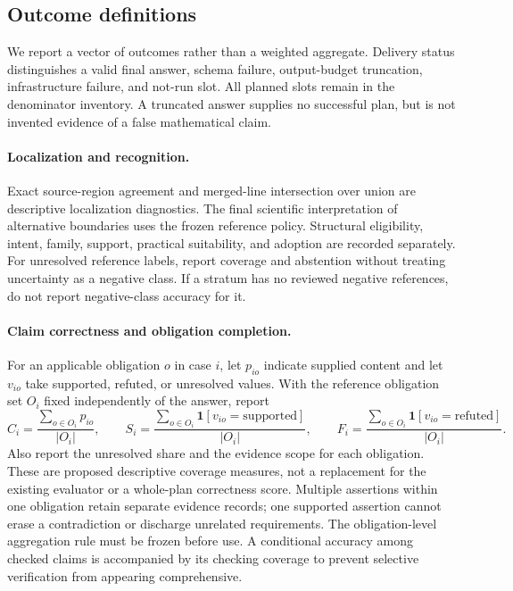 \subsection{Outcome definitions}
We report a vector of outcomes rather than a weighted aggregate. Delivery status
distinguishes a valid final answer, schema failure, output-budget truncation,
infrastructure failure, and not-run slot. All planned slots remain in the
denominator inventory. A truncated answer supplies no successful plan, but is not
invented evidence of a false mathematical claim.

\paragraph{Localization and recognition.}
Exact source-region agreement and merged-line intersection over union are
descriptive localization diagnostics. The final scientific interpretation of
alternative boundaries uses the frozen reference policy. Structural eligibility,
intent, family, support, practical suitability, and adoption are recorded
separately. For unresolved reference labels, report coverage and abstention
without treating uncertainty as a negative class. If a stratum has no reviewed
negative references, do not report negative-class accuracy for it.

\paragraph{Claim correctness and obligation completion.}
For an applicable obligation $o$ in case $i$, let $p_{io}$ indicate supplied
content and let $v_{io}$ take supported, refuted, or unresolved values. With the
reference obligation set $O_i$ fixed independently of the answer, report
\begin{equation}
 C_i=\frac{\sum_{o\in O_i}p_{io}}{|O_i|},\qquad
 S_i=\frac{\sum_{o\in O_i}\mathbf{1}[v_{io}=\text{supported}]}{|O_i|},\qquad
 F_i=\frac{\sum_{o\in O_i}\mathbf{1}[v_{io}=\text{refuted}]}{|O_i|}.
 \label{eq:metrics}
\end{equation}
Also report the unresolved share and the evidence scope for each obligation.
These are proposed descriptive coverage measures, not a replacement for the
existing evaluator or a whole-plan correctness score. Multiple assertions within
one obligation retain separate evidence records; one supported assertion cannot
erase a contradiction or discharge unrelated requirements. The obligation-level
aggregation rule must be frozen before use. A conditional accuracy among checked
claims is accompanied by its checking coverage to prevent selective verification
from appearing comprehensive.

